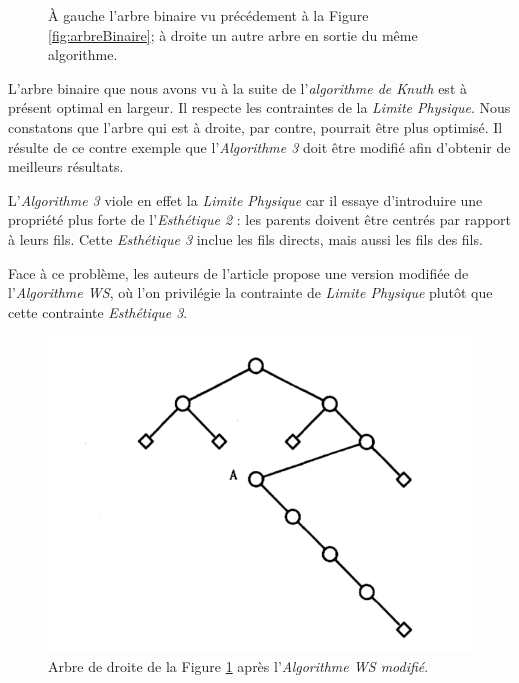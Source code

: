 \documentclass{article}
\begin{document}
\begin{figure}[h]
\begin{center}
\begin{right}
          \end{right}
        \end{center}
    	\caption{À gauche l'arbre binaire vu précédement à la Figure \ref{fig:arbreBinaire}; à droite un autre arbre en sortie du même algorithme.  \cite{article79}}
      \label{fig:arbresAlgo3}
    \end{figure}
    \vfill


    L'arbre binaire que nous avons vu à la suite de l'\emph{algorithme de Knuth} est à présent optimal en largeur. Il respecte les contraintes de la \emph{Limite Physique}. Nous constatons que l'arbre qui est à droite, par contre, pourrait être plus optimisé. Il résulte de ce contre exemple que l'\emph{Algorithme 3} doit être modifié afin d'obtenir de meilleurs résultats.

    L'\emph{Algorithme 3} viole en effet la \emph{Limite Physique} car il essaye d'introduire une propriété plus forte de l'\emph{Esthétique 2} : les parents doivent être centrés par rapport à leurs fils.
    Cette \emph{Esthétique 3} inclue les fils directs, mais aussi les fils des fils.

    Face à ce problème, les auteurs de l'article \cite{article79} propose une version modifiée de l'\emph{Algorithme WS}, où l'on privilégie la contrainte de \emph{Limite Physique} plutôt que cette contrainte \emph{Esthétique 3}.

    \vfill
    \begin{figure}[h]
        \begin{center}
      		\includegraphics[scale=0.5]{arbreWS.png}
        \end{center}
    	\caption{Arbre de droite de la Figure \ref{fig:arbresAlgo3} après l'\emph{Algorithme WS modifié}. \cite{article79}}
      \label{fig:arbresAlgoWS}
    \end{figure}
    \vfill
    
\end{document}
